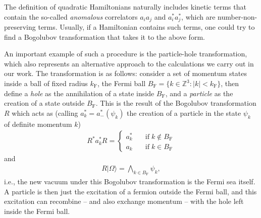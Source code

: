 The definition of quadratic Hamiltonians naturally includes kinetic terms that contain the
so-called \textit{anomalous} correlators $a_ia_j$ and $a^*_ia^*_j$, which are
number-non-preserving terms. Usually, if a Hamiltonian contains such terms, one could try to
find a Bogolubov transformation that takes it to the above form.
\begin{example}
	An important example of such a procedure is the particle-hole transformation, which also
	represents an alternative approach to the calculations we carry out in our work. The
	transformation is as follows: consider a set of momentum states inside a ball of fixed
	radius $k_{\mathrm{F}}$, the Fermi ball $B_{\mathrm{F}} =\{k\in\mathbb{Z}^3:|k|<
	k_{\mathrm{F}}\}$, then define a \textit{hole} as the annihilation of a state inside
	$B_{\mathrm{F}}$, and a \textit{particle} as the creation of a state outside
	$B_{\mathrm{F}}$. This is the result of the Bogolubov transformation $R$ which acts as
	(calling $a^*_k=a^*_-(\psi_k)$ the creation of a particle in the state $\psi_k$ of
	definite momentum $k$)
	\begin{align*}
		R^*a^*_k R = \begin{cases}
			a^*_k\quad&\text{if}\;k\not\in B_{\mathrm{F}}\\
			a_k  \quad&\text{if}\;k\in B_{\mathrm{F}}
		\end{cases}
	\end{align*}
	and
	\begin{align*}
		R|\Omega\rangle = \bigwedge_{k\in B_{\mathrm{F}}}\psi_k,
	\end{align*}
	i.e., the new vacuum under this Bogolubov transformation is the Fermi sea itself. A
	particle is then just the excitation of a fermion outside the Fermi ball, and this
	excitation can recombine -- and also exchange momentum -- with the hole left inside the
	Fermi ball.
\end{example}
